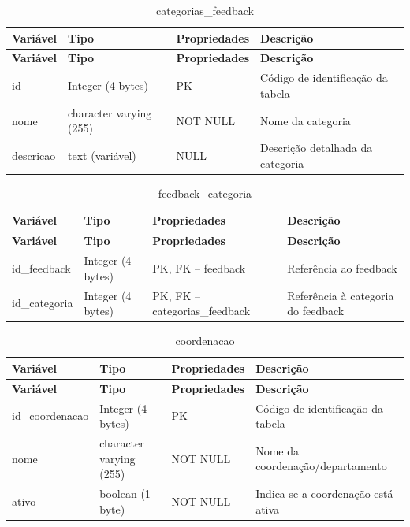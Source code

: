 \fonteautores

\vspace{\baselineskip}

\Needspace{0.32\textheight}
\begin{longtable}{|L{5.2cm}|L{3.2cm}|L{2.4cm}|L{3.4cm}|}
\caption{categorias\_feedback} \\
\hline
\textbf{Variável} & \textbf{Tipo} & \textbf{Propriedades} & \textbf{Descrição} \\
\hline
\endfirsthead
\hline
\textbf{Variável} & \textbf{Tipo} & \textbf{Propriedades} & \textbf{Descrição} \\
\hline
\endhead
id & Integer (4 bytes) & PK & Código de identificação da tabela \\
\hline
nome & character varying (255) & NOT NULL & Nome da categoria \\
\hline
descricao & text (variável) & NULL & Descrição detalhada da categoria \\
\hline
\end{longtable}

\fonteautores

\vspace{\baselineskip}

\Needspace{0.32\textheight}
\begin{longtable}{|L{5.2cm}|L{3.2cm}|L{2.4cm}|L{3.4cm}|}
\caption{feedback\_categoria} \\
\hline
\textbf{Variável} & \textbf{Tipo} & \textbf{Propriedades} & \textbf{Descrição} \\
\hline
\endfirsthead
\hline
\textbf{Variável} & \textbf{Tipo} & \textbf{Propriedades} & \textbf{Descrição} \\
\hline
\endhead
id\_feedback & Integer (4 bytes) & PK, FK – feedback & Referência ao feedback \\
\hline
id\_categoria & Integer (4 bytes) & PK, FK – categorias\_feedback & Referência à categoria do feedback \\
\hline
\end{longtable}

\fonteautores

\vspace{\baselineskip}

\Needspace{0.32\textheight}
\begin{longtable}{|L{5.2cm}|L{3.2cm}|L{2.4cm}|L{3.4cm}|}
\caption{coordenacao} \\
\hline
\textbf{Variável} & \textbf{Tipo} & \textbf{Propriedades} & \textbf{Descrição} \\
\hline
\endfirsthead
\hline
\textbf{Variável} & \textbf{Tipo} & \textbf{Propriedades} & \textbf{Descrição} \\
\hline
\endhead
id\_coordenacao & Integer (4 bytes) & PK & Código de identificação da tabela \\
\hline
nome & character varying (255) & NOT NULL & Nome da coordenação/departamento \\
\hline
ativo & boolean (1 byte) & NOT NULL & Indica se a coordenação está ativa \\
\hline
\end{longtable}

